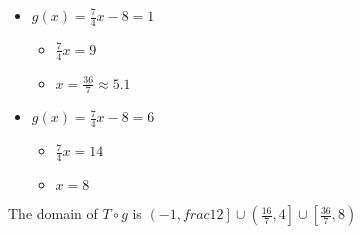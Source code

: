 \documentclass{ximera}
\begin{document}
\begin{itemize}
\item $g(x) = \frac{7}{4}x -8 = 1$
\begin{itemize}
\item $\frac{7}{4}x = 9$
\item $x = \frac{36}{7} \approx 5.1$
\end{itemize}
\end{itemize}

\begin{itemize}
\item $g(x) = \frac{7}{4}x -8 = 6$
\begin{itemize}
\item $\frac{7}{4}x = 14$
\item $x = 8$
\end{itemize}
\end{itemize}











The domain of $T \circ g$ is $\left( -1, frac{1}{2} \right] \cup \left( \frac{16}{7}, 4 \right] \cup \left[ \frac{36}{7}, 8 \right)$ \\
\end{document}
